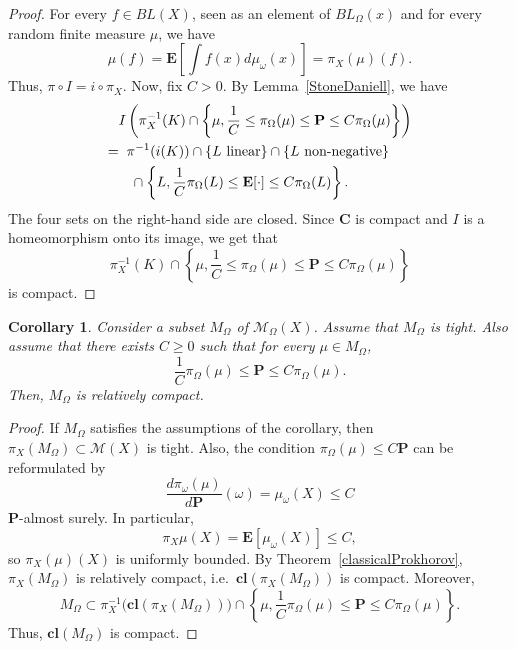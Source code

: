 \documentclass{amsart}
\newtheorem{cor}[thm]{Corollary}
\theoremstyle{definition}
\theoremstyle{remark}
\begin{document}
\begin{proof}
For every $f\in BL(X)$, seen as an element of $BL_\Omega(x)$ and for every random finite measure $\mu$, we have
$$\mu(f)=\mathbf E\left [\int f(x)d\mu_\omega(x)\right ]=\pi_X(\mu)(f).$$
Thus, $\pi \circ I=i\circ \pi_X$.
Now, fix $C>0$.
By Lemma~\ref{StoneDaniell}, we have
\begin{align*}
&I\left (\pi_X^{-1}(K)\cap \left \{\mu, \frac{1}{C}\leq \pi_\Omega(\mu)\leq \mathbf P\leq C\pi_\Omega(\mu)\right\}\right)\\
=&\hspace{.2cm}\pi^{-1}(i(K))\cap \{L \text{ linear}\}\cap \{ L\text{ non-negative}\}\\
&\hspace{.3cm}\cap \left \{L, \frac{1}{C}\pi_\Omega(L)\leq \mathbf E[\cdot]\leq C\pi_\Omega(L)\right \}.
\end{align*}
The four sets on the right-hand side are closed.
Since $\mathbf C$ is compact and $I$ is a homeomorphism onto its image, we get that
$$ \pi_X^{-1}(K)\cap \left \{\mu, \frac{1}{C}\leq \pi_\Omega(\mu)\leq \mathbf P\leq C\pi_\Omega(\mu)\right\}$$
is compact.
\end{proof}


\begin{cor}\label{coroProkhorov}
Consider a subset $M_\Omega$ of $\mathcal{M}_\Omega(X)$.
Assume that $M_\Omega$ is tight.
Also assume that there exists $C\geq 0$ such that for every $\mu\in M_\Omega$,
$$\frac{1}{C}\pi_\Omega(\mu)\leq \mathbf P \leq C \pi_\Omega(\mu).$$
Then, $M_\Omega$ is relatively compact.
\end{cor}

\begin{proof}
If $M_\Omega$ satisfies the assumptions of the corollary, then $\pi_X(M_\Omega)\subset \mathcal{M}(X)$ is tight.
Also, the condition $\pi_\Omega(\mu)\leq C \mathbf P$ can be reformulated by
$$\frac{d\pi_\omega(\mu)}{d\mathbf P}(\omega)=\mu_\omega(X)\leq C$$
$\mathbf P$-almost surely.
In particular,
$$\pi_X\mu(X)=\mathbf E[\mu_\omega(X)]\leq C,$$
so $\pi_X(\mu)(X)$ is uniformly bounded.
By Theorem~\ref{classicalProkhorov}, $\pi_X(M_\Omega)$ is relatively compact, i.e.\ $\mathbf{cl}(\pi_X(M_\Omega))$ is compact.
Moreover,
$$M_\Omega\subset \pi_X^{-1}\big(\mathbf{cl}(\pi_X(M_\Omega))\big )\cap \left \{\mu,\frac{1}{C}\pi_\Omega(\mu)\leq \mathbf P\leq C\pi_\Omega(\mu)\right \}.$$
Thus, $\mathbf{cl}(M_\Omega)$ is compact.
\end{proof}
\end{document}
